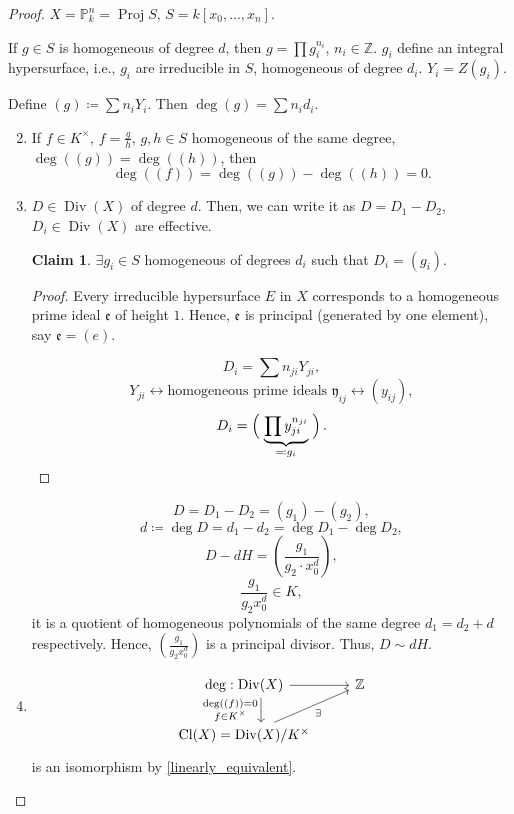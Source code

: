 \documentclass[12pt]{article}
\DeclareMathOperator{\Proj}{Proj}
\DeclareMathOperator{\Div}{Div}
\DeclareMathOperator{\Cl}{Cl}
\theoremstyle{definition}
\newtheorem*{claim}{Claim}
\begin{document}
\begin{proof}
$X=\mathbb{P}_k^n=\Proj S$, $S=k[x_0,\ldots,x_n]$.

If $g\in S$ is homogeneous of degree $d$, then $g=\prod g_i^{n_i}$, $n_i\in\mathbb{Z}$. $g_i$ define an integral hypersurface, i.e., $g_i$ are irreducible in $S$, homogeneous of degree $d_i$. $Y_i=Z(g_i)$. 

Define $(g)\coloneqq\sum n_iY_i$. Then $\deg(g)=\sum n_id_i$.

\begin{enumerate}[label=\arabic*)]
\setcounter{enumi}{1}
\item If $f\in K^{\times}$, $f=\frac{g}{h}$, $g,h\in S$ homogeneous of the same degree, $\deg((g))=\deg((h))$, then
\[\deg((f))=\deg((g))-\deg((h))=0.\]

\setcounter{enumi}{0}
\item $D\in\Div(X)$ of degree $d$. Then, we can write it as $D=D_1-D_2$, $D_i\in\Div(X)$ are effective.

\begin{claim}
$\exists g_i\in S$ homogeneous of degrees $d_i$ such that $D_i=(g_i)$.
\end{claim}

\begin{proof}
Every irreducible hypersurface $E$ in $X$ corresponds to a homogeneous prime ideal $\mathfrak{e}$ of height $1$. Hence, $\mathfrak{e}$ is principal (generated by one element), say $\mathfrak{e}=(e)$.

\[D_i=\sum n_{ji}Y_{ji},\]
\[Y_{ji}\longleftrightarrow\text{homogeneous prime ideals }\mathfrak{y}_{ij}\longleftrightarrow(y_{ij}),\]
\[D_i=\left(\vphantom{\prod y_{ji}^{n_{ji}}}\right.\underbrace{\prod y_{ji}^{n_{ji}}}_{\eqqcolon g_i}\left.\vphantom{\prod y_{ji}^{n_{ji}}}\right).\]
\end{proof}

\[D=D_1-D_2=(g_1)-(g_2),\]
\[d\coloneqq\deg D=d_1-d_2=\deg D_1-\deg D_2,\]
\[D-dH=\left(\frac{g_1}{g_2\cdot x_0^d}\right),\]
\[\frac{g_1}{g_2x_0^d}\in K,\]
it is a quotient of homogeneous polynomials of the same degree $d_1=d_2+d$ respectively. Hence, $(\frac{g_1}{g_2x_0^d})$ is a principal divisor. Thus, $D\sim dH$.

\setcounter{enumi}{2}
\item
\[
\begin{tikzcd}
\deg:\Div(X)\arrow[r]\arrow[d,shift left=5,"\substack{\deg((f))=0\\
f\in K^{\times}}",swap]&\mathbb{Z}\\
\Cl(X)=\Div(X)/K^{\times}\arrow[ru,"\exists",swap]
\end{tikzcd}
\]
is an isomorphism by \ref{linearly_equivalent}.
\end{enumerate}
\end{proof}
\end{document}

